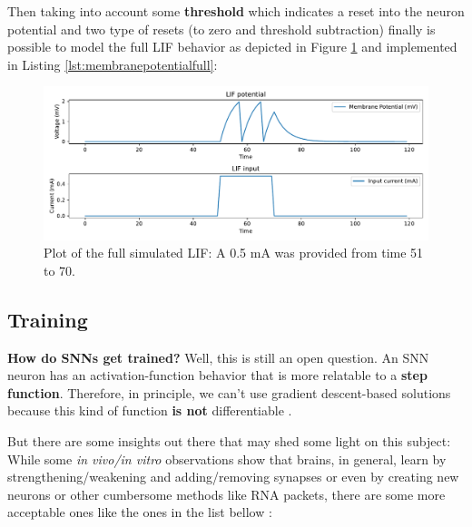  			\par Then taking into account some \textbf{threshold} which indicates a reset into the neuron potential and two type of resets (to zero and threshold subtraction) finally is possible to model the full LIF  behavior as depicted in Figure \ref{fig:membranepotentialfull} and implemented in Listing \ref{lst:membranepotentialfull}:
 			
 			
 			
 			\begin{figure}[H]
 				\centering
 				\includegraphics[width=\linewidth]{images/membranePotentialFull}
 				\caption{Plot of the full simulated LIF: A 0.5 mA was provided from time 51 to 70.}
 				\label{fig:membranepotentialfull}
 			\end{figure}
 			
 	\subsection{Training}
 	
		\par \textbf{How do SNNs get trained?} Well, this is still an open question. An SNN neuron has an activation-function behavior that is more relatable to a \textbf{step function}. Therefore, in principle, we can't use gradient descent-based solutions because this kind of function \textbf{is not} differentiable \cite{kasabov2019time}.
		
		\par But there are some insights out there that may shed some light on this subject: While some \textit{in vivo/in vitro} observations show that brains, in general, learn by strengthening/weakening and adding/removing synapses or even by creating new neurons or other cumbersome methods like RNA packets, there are some more acceptable ones like the ones in the list bellow \cite{kasabov2019time}:
 	
